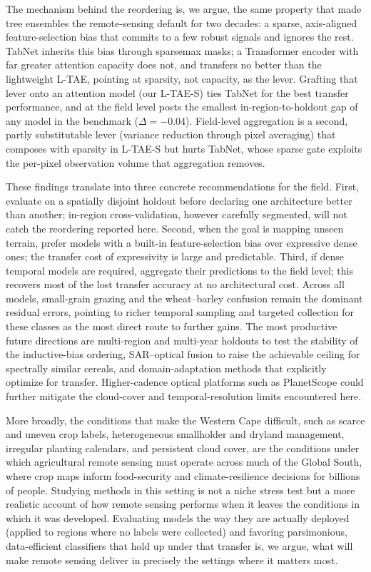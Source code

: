 \documentclass[pdflatex,sn-mathphys]{sn-jnl} %
\begin{document}
The mechanism behind the reordering is, we argue, the same property that made tree
ensembles the remote-sensing default for two decades: a sparse, axis-aligned
feature-selection bias that commits to a few robust signals and ignores the rest. TabNet
inherits this bias through sparsemax masks; a Transformer encoder with far greater
attention capacity does not, and transfers no better than the lightweight L-TAE,
pointing at sparsity, not capacity, as the lever. Grafting that lever onto an attention
model (our L-TAE-S) ties TabNet for the best transfer performance, and at the field
level posts the smallest in-region-to-holdout gap of any model in the benchmark
($\Delta = -0.04$). Field-level aggregation is a second, partly substitutable lever
(variance reduction through pixel averaging) that composes with sparsity in L-TAE-S
but hurts TabNet, whose sparse gate exploits the per-pixel observation volume that
aggregation removes.

These findings translate into three concrete recommendations for the field. First,
evaluate on a spatially disjoint holdout before declaring one architecture better than
another; in-region cross-validation, however carefully segmented, will not catch the
reordering reported here. Second, when the goal is mapping unseen terrain, prefer models
with a built-in feature-selection bias over expressive dense ones; the transfer cost of
expressivity is large and predictable. Third, if dense temporal models are required,
aggregate their predictions to the field level; this recovers most of the lost
transfer accuracy at no architectural cost. Across all models, small-grain grazing and
the wheat–barley confusion remain the dominant residual errors, pointing to richer
temporal sampling and targeted collection for these classes as the most direct route to
further gains. The most productive future directions are multi-region and multi-year
holdouts to test the stability of the inductive-bias ordering, SAR–optical fusion to
raise the achievable ceiling for spectrally similar cereals, and domain-adaptation
methods that explicitly optimize for transfer. Higher-cadence optical platforms such as
PlanetScope could further mitigate the cloud-cover and temporal-resolution limits
encountered here.

More broadly, the conditions that make the Western Cape difficult, such as scarce and uneven
crop labels, heterogeneous smallholder and dryland management, irregular planting
calendars, and persistent cloud cover, are the conditions under which agricultural
remote sensing must operate across much of the Global South, where crop maps inform
food-security and climate-resilience decisions for billions of people. Studying methods
in this setting is not a niche stress test but a more realistic account of how remote
sensing performs when it leaves the conditions in which it was developed. Evaluating
models the way they are actually deployed (applied to regions where no labels were
collected) and favoring parsimonious, data-efficient classifiers that hold up under
that transfer is, we argue, what will make remote sensing deliver in precisely the
settings where it matters most.
\end{document}
